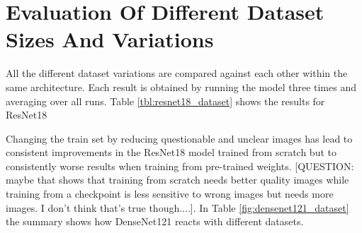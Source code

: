\section{Evaluation Of Different Dataset Sizes And Variations}

All the different dataset variations are compared against each other within the same architecture. Each result is obtained by running the model three times and averaging over all runs. Table \ref{tbl:resnet18_dataset} shows the results for ResNet18

\begin{table}[h] \centering
{}
\caption{Dataset variations with ResNet18. The first group shows how the datasets performed when trained from scratch whereas the second group shows how the datasets performed with pre-training.}
\label{tbl:resnet18_dataset}
\end{table}

Changing the train set by reducing questionable and unclear images has lead to consistent improvements in the ResNet18 model trained from scratch but to consistently worse results when training from pre-trained weights. [QUESTION: maybe that shows that training from scratch needs better quality images while training from a checkpoint is less sensitive to wrong images but needs more images. I don't think that's true though....]. In Table \ref{fig:densenet121_dataset} the summary shows how DenseNet121 reacts with different datasets.

